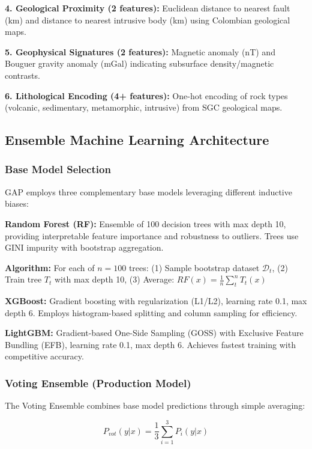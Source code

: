 \documentclass[12pt,a4paper]{article}
\begin{document}
\textbf{4. Geological Proximity (2 features):} Euclidean distance to nearest fault (km) and distance to nearest intrusive body (km) using Colombian geological maps.

\textbf{5. Geophysical Signatures (2 features):} Magnetic anomaly (nT) and Bouguer gravity anomaly (mGal) indicating subsurface density/magnetic contrasts.

\textbf{6. Lithological Encoding (4+ features):} One-hot encoding of rock types (volcanic, sedimentary, metamorphic, intrusive) from SGC geological maps.

\subsection{Ensemble Machine Learning Architecture}

\subsubsection{Base Model Selection}

GAP employs three complementary base models leveraging different inductive biases:

\textbf{Random Forest (RF):} Ensemble of 100 decision trees with max depth 10, providing interpretable feature importance and robustness to outliers. Trees use GINI impurity with bootstrap aggregation.

\textbf{Algorithm:} For each of $n=100$ trees: (1) Sample bootstrap dataset $\mathcal{D}_t$, (2) Train tree $T_t$ with max depth 10, (3) Average: $RF(x) = \frac{1}{n}\sum_{t}^{n} T_t(x)$

\textbf{XGBoost:} Gradient boosting with regularization (L1/L2), learning rate 0.1, max depth 6. Employs histogram-based splitting and column sampling for efficiency.

\textbf{LightGBM:} Gradient-based One-Side Sampling (GOSS) with Exclusive Feature Bundling (EFB), learning rate 0.1, max depth 6. Achieves fastest training with competitive accuracy.

\subsubsection{Voting Ensemble (Production Model)}

The Voting Ensemble combines base model predictions through simple averaging:

\begin{equation}
P_{vot}(y|x) = \frac{1}{3}\sum_{i=1}^{3} P_i(y|x)
\end{equation}
\end{document}
